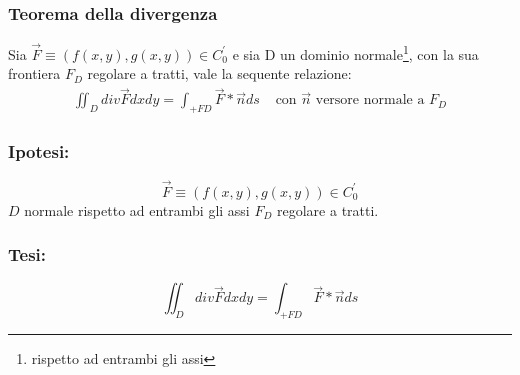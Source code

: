 \subsubsection{Teorema della divergenza \label{tdiv}}
\begin{teorema}
	Sia $\vec{F}\equiv (f(x,y), g(x,y))\in C_0^\prime$ e sia D un dominio
	normale\footnote{rispetto ad entrambi gli assi}, con la sua frontiera $F_D$
	regolare a tratti, vale la sequente relazione:
	\begin{equation*}
		\begin{matrix}
			\iint_D div \vec{F}dxdy=\int_{+FD}\vec{F}*\vec{n}ds & \text{ con }
			\vec{n} \text{ versore normale a } F_D
		\end{matrix}
	\end{equation*}
	\begin{multicols}{2}
		\subsubsection{Ipotesi:}
		\begin{equation*}
			\vec{F}\equiv (f(x,y), g(x,y))\in C_0^\prime
		\end{equation*}
		$D$ normale rispetto ad entrambi gli assi $F_D$ regolare a tratti.
		\subsubsection{Tesi:}
		\begin{equation*}
			\iint_D div \vec{F}dxdy=\int_{+FD}\vec{F}*\vec{n}ds
		\end{equation*}
	\end{multicols}
\end{teorema}
